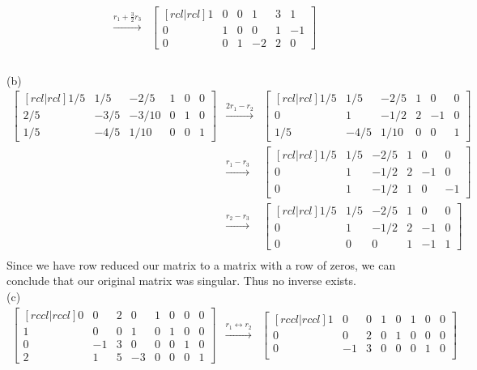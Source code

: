 \begin{solution}
\begin{eqnarray*}
&\xrightarrow[]{r_1 + \frac{3}{2}r_3}&
\begin{bmatrix}[rcl|rcl]
1&0&0&1&3&1\\
0&1&0&0&1&-1\\
0&0&1&-2&2&0
\end{bmatrix}\\
\end{eqnarray*}
\ \\
(b)
\begin{eqnarray*}
\begin{bmatrix}[rcl|rcl]
1/5&1/5&-2/5&1&0&0\\
2/5&-3/5&-3/10&0&1&0\\
1/5&-4/5&1/10&0&0&1
\end{bmatrix}
&\xrightarrow[]{2r_1 - r_2}&
\begin{bmatrix}[rcl|rcl]
1/5&1/5&-2/5&1&0&0\\
0&1&-1/2&2&-1&0\\
1/5&-4/5&1/10&0&0&1
\end{bmatrix}\\
&\xrightarrow[]{r_1 - r_3}&
\begin{bmatrix}[rcl|rcl]
1/5&1/5&-2/5&1&0&0\\
0&1&-1/2&2&-1&0\\
0&1&-1/2&1&0&-1
\end{bmatrix}\\
&\xrightarrow[]{r_2 - r_3}&
\begin{bmatrix}[rcl|rcl]
1/5&1/5&-2/5&1&0&0\\
0&1&-1/2&2&-1&0\\
0&0&0&1&-1&1
\end{bmatrix}\\
\end{eqnarray*}
Since we have row reduced our matrix to a matrix with a row of zeros, we can conclude that our original matrix was singular. Thus no inverse exists.
\ \\
(c)
\begin{eqnarray*}
\begin{bmatrix}[rccl|rccl]
0&0&2&0&1&0&0&0\\
1&0&0&1&0&1&0&0\\
0&-1&3&0&0&0&1&0\\
2&1&5&-3&0&0&0&1
\end{bmatrix}
&\xrightarrow[]{r_1 \leftrightarrow r_2}&
\begin{bmatrix}[rccl|rccl]
1&0&0&1&0&1&0&0\\
0&0&2&0&1&0&0&0\\
0&-1&3&0&0&0&1&0\\

\end{bmatrix}
\end{eqnarray*}
\end{solution}
